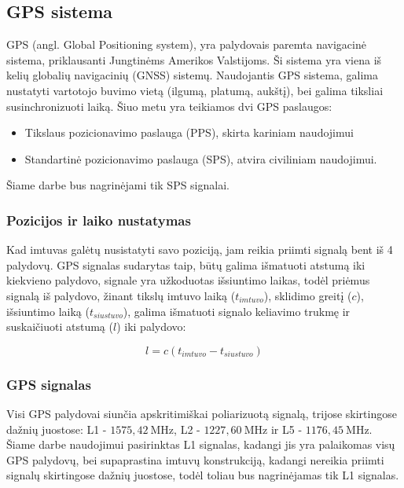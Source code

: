 \documentclass[main.tex]{subfiles}
\begin{document}
\subsection{GPS sistema}

GPS (angl. Global Positioning system), yra palydovais paremta navigacinė
sistema, priklausanti Jungtinėms Amerikos Valstijoms. Ši sistema yra viena
iš kelių globalių navigacinių (GNSS) sistemų. Naudojantis GPS sistema,
galima nustatyti vartotojo buvimo vietą (ilgumą, platumą, aukštį), bei
galima tiksliai susinchronizuoti laiką. Šiuo metu yra teikiamos dvi GPS paslaugos:

\begin{itemize}
    \item Tikslaus pozicionavimo paslauga (PPS)\cite{pps_standard}, skirta kariniam naudojimui
    \item Standartinė pozicionavimo paslauga (SPS)\cite{sps_standard},
    atvira civiliniam naudojimui.
\end{itemize}

\noindent Šiame darbe bus nagrinėjami tik SPS signalai.

\subsubsection{Pozicijos ir laiko nustatymas}

Kad imtuvas galėtų nusistatyti savo poziciją, jam reikia priimti signalą bent
iš 4 palydovų. GPS signalas sudarytas taip, būtų galima išmatuoti atstumą iki
kiekvieno palydovo, signale yra užkoduotas išsiuntimo laikas, todėl priėmus
signalą iš palydovo, žinant tikslų imtuvo laiką ($t_{imtuvo}$), sklidimo greitį ($c$),
išsiuntimo laiką ($t_{siustuvo}$), galima išmatuoti signalo keliavimo trukmę ir suskaičiuoti
atstumą ($l$) iki palydovo:

\begin{equation}
    l = c (t_{imtuvo} - t_{siustuvo})
\end{equation}

\subsubsection{GPS signalas}\label{sec:gps_signal}

Visi GPS palydovai siunčia apskritimiškai poliarizuotą signalą, trijose skirtingose
dažnių juostose: L1 - $1575,42\ \mathrm{MHz}$, L2 - $1227,60\ \mathrm{MHz}$ ir
L5 - $1176,45\ \mathrm{MHz}$\cite{sps_standard}. Šiame darbe naudojimui pasirinktas
L1 signalas, kadangi jis yra palaikomas visų GPS palydovų, bei supaprastina imtuvų
konstrukciją, kadangi nereikia priimti signalų skirtingose dažnių juostose, todėl toliau
bus nagrinėjamas tik L1 signalas.
\end{document}
